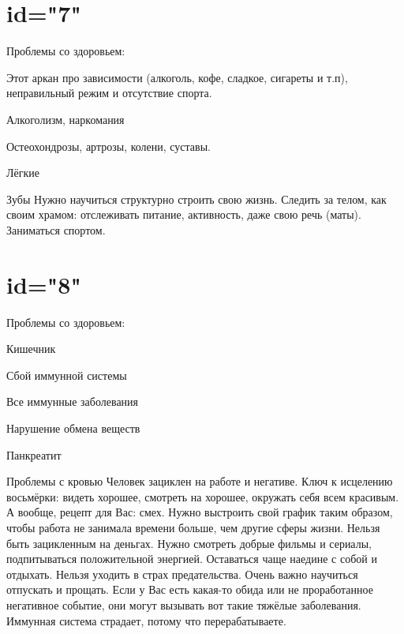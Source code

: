 \section{id="7"}{Проблемы со здоровьем:}
\item Этот аркан про зависимости (алкоголь, кофе, сладкое, сигареты и т.п), неправильный режим и отсутствие спорта.
\item Алкоголизм, наркомания
\item Остеохондрозы, артрозы, колени, суставы.
\item Лёгкие
\item Зубы
Нужно научиться структурно строить свою жизнь. 
Следить за телом, как своим храмом: отслеживать питание, активность, 
даже свою речь (маты). Заниматься спортом.
\endsection

\section{id="8"}{Проблемы со здоровьем:}
\item Кишечник
\item Сбой иммунной системы
\item Все иммунные заболевания
\item Нарушение обмена веществ
\item Панкреатит
\item Проблемы с кровью
Человек зациклен на работе и негативе. Ключ к исцелению восьмёрки: 
видеть хорошее, смотреть на хорошее, окружать себя всем красивым. 
А вообще, рецепт для Вас: смех. Нужно выстроить свой график таким 
образом, чтобы работа не занимала времени больше, чем другие сферы жизни. 
Нельзя быть зацикленным на деньгах.
Нужно смотреть добрые фильмы и сериалы, подпитываться положительной 
энергией. Оставаться чаще наедине с собой и отдыхать. Нельзя уходить 
в страх предательства. 
Очень важно научиться отпускать и прощать. Если у Вас есть какая-то 
обида или не проработанное негативное событие, они могут вызывать 
вот такие тяжёлые заболевания. 
Иммунная система страдает, потому что перерабатываете.
\endsection

